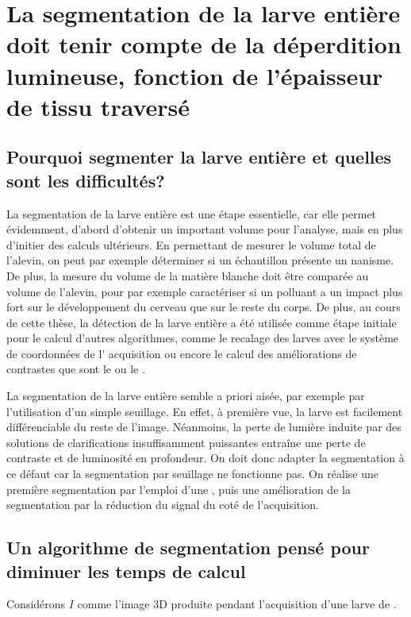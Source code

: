 \documentclass[\main/main.tex]{subfiles}
\begin{document}
\section{La segmentation de la larve entière doit tenir compte de la déperdition lumineuse, fonction de l'épaisseur de tissu traversé
\label{sec:algo:larva}
}

\subsection{Pourquoi segmenter la larve entière et quelles sont les difficultés?}

%
La segmentation de la larve entière est une étape essentielle, car elle permet évidemment, d'abord d'obtenir un important volume pour l'analyse, mais en plus d'initier des calculs ultérieurs.
%
En permettant de mesurer le volume total de l'alevin, on peut par exemple déterminer si un échantillon présente un nanisme. De plus, la mesure du volume de la matière blanche doit être comparée au volume de l'alevin,  pour par exemple caractériser si un polluant a un impact plus fort sur le développement du cerveau que sur le reste du corps.
%
De plus, au cours de cette thèse, la détection de la larve entière a été utilisée comme étape initiale pour le calcul d'autres algorithmes, comme le recalage des larves avec le système de coordonnées de l' acquisition ou encore le calcul des améliorations de contrastes que sont le \sbddcc{} ou le \sblc{}.

%
La segmentation de la larve entière semble a priori aisée, par exemple par l'utilisation d'un simple seuillage. En effet, à première vue, la larve est facilement différenciable du reste de l'image. Néanmoins, la perte de lumière induite par des solutions de clarifications insuffisamment puissantes entraîne une perte de contraste et de luminosité en profondeur.
On doit donc adapter la segmentation à ce défaut car la segmentation par seuillage ne fonctionne pas. On réalise une première segmentation par l'emploi d'une \watershed{}, puis une amélioration de la segmentation par la réduction du signal du coté de l'acquisition.

\subsection{Un algorithme de segmentation pensé pour diminuer les temps de calcul}

Considérons $I$ comme l'image 3D produite pendant l'acquisition d'une larve de \pz{}.
\end{document}

